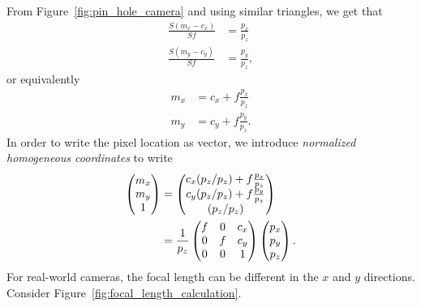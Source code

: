 From Figure~\ref{fig:pin_hole_camera} and using similar triangles, we get that
\begin{align*}
\frac{S(m_x-c_x)}{Sf} &= \frac{p_x}{p_z} \\	
\frac{S(m_y-c_y)}{Sf} &= \frac{p_y}{p_z},
\end{align*}
or equivalently
\begin{align*}
m_x &= c_x + f\frac{p_x}{p_z} \\	
m_y &= c_y + f\frac{p_y}{p_z}.
\end{align*}
In order to write the pixel location as vector, we introduce {\em normalized homogeneous coordinates} to write
\begin{align}
\begin{pmatrix}m_x \\ m_y \\ 1\end{pmatrix} 
	&= \begin{pmatrix} c_x(p_z/p_z) + f\frac{p_x}{p_z} \\ c_y(p_z/p_z) + f\frac{p_y}{p_z} \\ (p_z/p_z) \end{pmatrix} \notag \\
	&= \frac{1}{p_z}\begin{pmatrix} f & 0 & c_x \\ 0 & f & c_y \\ 0 & 0 & 1 \end{pmatrix}\begin{pmatrix}p_x \\ p_y \\ p_z \end{pmatrix}.
	\label{eq:intrinsic_parameters_1}
\end{align}
%
For real-world cameras, the focal length can be different in the $x$ and $y$ directions.  Consider Figure~\ref{fig:focal_length_calculation}.
